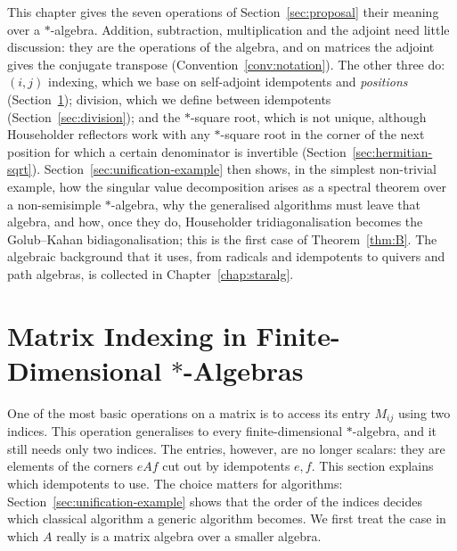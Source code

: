 \documentclass[12pt, a4paper]{report}
\theoremstyle{plain}
\theoremstyle{definition}
\theoremstyle{remark}
\theoremstyle{plain}
\begin{document}
This chapter gives the seven operations of Section~\ref{sec:proposal} their meaning over a $*$-algebra. Addition, subtraction, multiplication and the adjoint need little discussion: they are the operations of the algebra, and on matrices the adjoint gives the conjugate transpose (Convention~\ref{conv:notation}). The other three do: $(i,j)$ indexing, which we base on self-adjoint idempotents and \emph{positions} (Section~\ref{sec:indexing}); division, which we define between idempotents (Section~\ref{sec:division}); and the $*$-square root, which is not unique, although Householder reflectors work with any $*$-square root in the corner of the next position for which a certain denominator is invertible (Section~\ref{sec:hermitian-sqrt}). Section~\ref{sec:unification-example} then shows, in the simplest non-trivial example, how the singular value decomposition arises as a spectral theorem over a non-semisimple $*$-algebra, why the generalised algorithms must leave that algebra, and how, once they do, Householder tridiagonalisation becomes the Golub--Kahan bidiagonalisation; this is the first case of Theorem~\ref{thm:B}. The algebraic background that it uses, from radicals and idempotents to quivers and path algebras, is collected in Chapter~\ref{chap:staralg}.
\section{Matrix Indexing in Finite-Dimensional \texorpdfstring{$*$}{*}-Algebras}
\label{sec:indexing}
One of the most basic operations on a matrix is to access its entry $M_{ij}$ using two indices. This operation generalises to every finite-dimensional $*$-algebra, and it still needs only two indices. The entries, however, are no longer scalars: they are elements of the corners $eAf$ cut out by idempotents $e,f$. This section explains which idempotents to use. The choice matters for algorithms: Section~\ref{sec:unification-example} shows that the order of the indices decides which classical algorithm a generic algorithm becomes. We first treat the case in which $A$ really is a matrix algebra over a smaller algebra.
\end{document}

